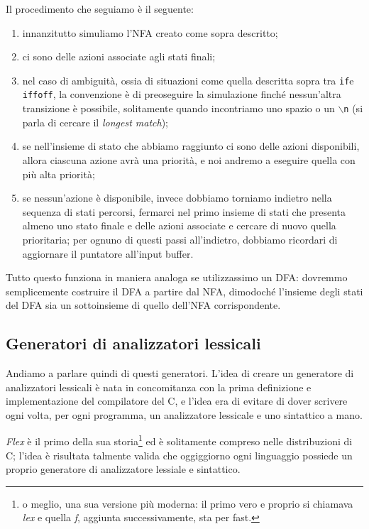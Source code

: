 \documentclass[class=book, crop=false, oneside, 12pt]{standalone}
\begin{document}
Il procedimento che seguiamo è il seguente:
\begin{enumerate}
    \item innanzitutto simuliamo l'NFA creato come sopra descritto;
    \item ci sono delle azioni associate agli stati finali;
    \item nel caso di ambiguità, ossia di situazioni come quella descritta sopra tra \texttt{if}e \texttt{iffoff},  la convenzione è di preoseguire la simulazione finché nessun’altra transizione è possibile, solitamente quando incontriamo uno spazio o un \texttt{\(\backslash\)n} (si parla di cercare il \emph{longest match});
    \item se nell'insieme di stato che abbiamo raggiunto ci sono delle azioni disponibili, allora ciascuna azione avrà una priorità, e noi andremo a eseguire quella con più alta priorità;
    \item se nessun'azione è disponibile, invece dobbiamo torniamo indietro nella sequenza di stati percorsi, fermarci nel primo insieme di stati che presenta almeno uno stato finale e delle azioni associate e cercare di nuovo quella prioritaria; per ognuno di questi passi all'indietro, dobbiamo ricordari di aggiornare il puntatore all'input buffer.
\end{enumerate}

Tutto questo funziona in maniera analoga se utilizzassimo un DFA: dovremmo semplicemente costruire il DFA a partire dal NFA, dimodoché l'insieme degli stati del DFA sia un sottoinsieme di quello dell'NFA corrispondente.

\subsection{Generatori di analizzatori lessicali}
Andiamo a parlare quindi di questi generatori. L'idea di creare un generatore di analizzatori lessicali è nata in concomitanza con la prima definizione e implementazione del compilatore del C, e l'idea era di evitare di dover scrivere ogni volta, per ogni programma, un analizzatore lessicale e uno sintattico a mano.

\emph{Flex} è il primo della sua storia\footnote{o meglio, una sua versione più moderna: il primo vero e proprio si chiamava \emph{lex} e quella \emph{f}, aggiunta successivamente, sta per fast.} ed è solitamente compreso nelle distribuzioni di C; l'idea è risultata talmente valida che oggiggiorno ogni linguaggio possiede un proprio generatore di analizzatore lessiale e sintattico.
\end{document}
